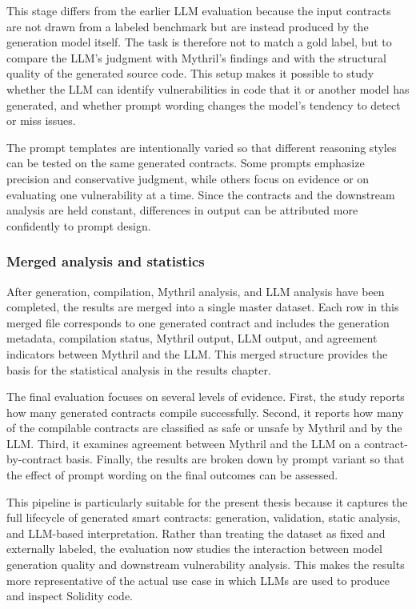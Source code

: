 \documentclass[a4paper,11pt]{article}\usepackage{graphicx} %
\begin{document}
This stage differs from the earlier LLM evaluation because the input contracts are not drawn from a labeled benchmark but are instead produced by the generation model itself. The task is therefore not to match a gold label, but to compare the LLM's judgment with Mythril's findings and with the structural quality of the generated source code. This setup makes it possible to study whether the LLM can identify vulnerabilities in code that it or another model has generated, and whether prompt wording changes the model's tendency to detect or miss issues.

The prompt templates are intentionally varied so that different reasoning styles can be tested on the same generated contracts. Some prompts emphasize precision and conservative judgment, while others focus on evidence or on evaluating one vulnerability at a time. Since the contracts and the downstream analysis are held constant, differences in output can be attributed more confidently to prompt design.

\subsubsection{Merged analysis and statistics}

After generation, compilation, Mythril analysis, and LLM analysis have been completed, the results are merged into a single master dataset. Each row in this merged file corresponds to one generated contract and includes the generation metadata, compilation status, Mythril output, LLM output, and agreement indicators between Mythril and the LLM. This merged structure provides the basis for the statistical analysis in the results chapter.

The final evaluation focuses on several levels of evidence. First, the study reports how many generated contracts compile successfully. Second, it reports how many of the compilable contracts are classified as safe or unsafe by Mythril and by the LLM. Third, it examines agreement between Mythril and the LLM on a contract-by-contract basis. Finally, the results are broken down by prompt variant so that the effect of prompt wording on the final outcomes can be assessed.

This pipeline is particularly suitable for the present thesis because it captures the full lifecycle of generated smart contracts: generation, validation, static analysis, and LLM-based interpretation. Rather than treating the dataset as fixed and externally labeled, the evaluation now studies the interaction between model generation quality and downstream vulnerability analysis. This makes the results more representative of the actual use case in which LLMs are used to produce and inspect Solidity code.
\end{document}
